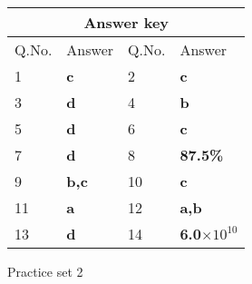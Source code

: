 \setlength\arrayrulewidth{1pt}
\begin{table}[H]
	\centering
	
	\begin{tabular}{|p{1.5cm}|p{1.5cm}||p{1.5cm}|p{1.5cm}|}
		\hline
		\multicolumn{4}{|c|}{\textbf{Answer key}}\\\hline\hline
		\rowcolor{ocrel}Q.No.&Answer&Q.No.&Answer\\\hline
		1&\textbf{c}&2&\textbf{c}\\\hline
		3&\textbf{d}&4&\textbf{b}\\\hline
		5&\textbf{d}&6&\textbf{c}\\\hline
		7&\textbf{d}&8&\textbf{87.5\%}\\\hline
		9&\textbf{b,c}&10&\textbf{c}\\\hline
		11&\textbf{a}&12&\textbf{a,b}\\\hline
		13&\textbf{d}&14&\textbf{6.0$\times 10^{10}$}\\\hline
	
	\end{tabular}
\end{table}
\newpage 
\begin{abox}
	Practice set 2
	\end{abox}

